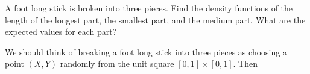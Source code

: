 \begin{problem}[Handout 18, \# 17]
  A foot long stick is broken into three pieces. Find the density functions
  of the length of the longest part, the smallest part, and the medium
  part. What are the expected values for each part?
\end{problem}
\begin{solution}
  We should think of breaking a foot long stick into three pieces as
  choosing a point \((X,Y)\) randomly from the unit square
  \([0,1]\times[0,1]\). Then


\end{solution}


